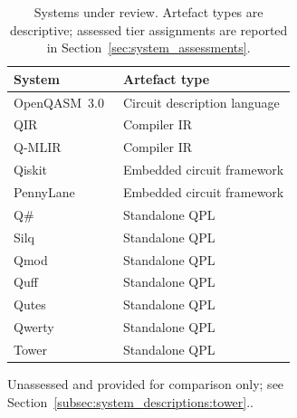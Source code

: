 \begin{table}[htbp]
    \centering
    \caption{Systems under review. Artefact types are descriptive; assessed tier assignments are reported in Section~\ref{sec:system_assessments}.}
    \label{tab:taxonomy:systems}
    \begin{threeparttable}
        \footnotesize
        \begin{tabular}{ll}
            \toprule
            \textbf{System}                                           & \textbf{Artefact type}       \\
            \midrule
            OpenQASM~3.0~\cite{cross2022openqasm3}                    & Circuit description language \\
            \addlinespace
            QIR~\cite{qir_alliance_qir_spec_repo}                     & Compiler IR                  \\
            \addlinespace
            Q-MLIR~\cite{McCaskey2021MLIRDialectQASM}                 & Compiler IR                  \\
            \addlinespace
            Qiskit~\cite{aleksandrowicz2019qiskit}                    & Embedded circuit framework   \\
            \addlinespace
            PennyLane~\cite{bergholm2018pennylane}                    & Embedded circuit framework   \\
            \addlinespace
            Q\#~\cite{MicrosoftQSharpOverview}                        & Standalone QPL               \\
            \addlinespace
            Silq~\cite{bichsel2020silq}                               & Standalone QPL               \\
            \addlinespace
            Qmod~\cite{vax2025qmodexpressivehighlevelquantum}         & Standalone QPL               \\
            \addlinespace
            Quff~\cite{wright2024quff}                                & Standalone QPL               \\
            \addlinespace
            Qutes~\cite{faro2025qutes,reversiblelifetime2026}         & Standalone QPL               \\
            \addlinespace
            Qwerty~\cite{adams2024qwerty}                             & Standalone QPL               \\
            \addlinespace
            Tower~\cite{yuan2025foundationalabstractions}\tnote{\dag} & Standalone QPL               \\
            \bottomrule
        \end{tabular}
        \begin{tablenotes}
            \footnotesize
            \item[\dag] Unassessed and provided for comparison only\ifthesis; see Section~\ref{subsec:system_descriptions:tower}.\else.\fi
        \end{tablenotes}
    \end{threeparttable}
\end{table}
\fi
